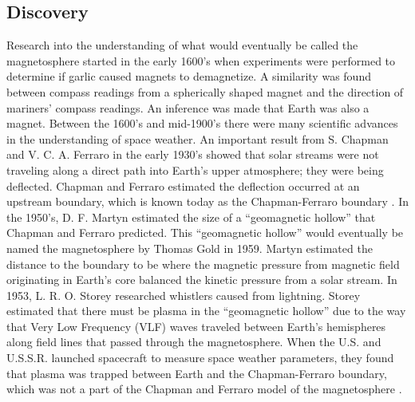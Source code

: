 \subsection{Discovery}
Research into the understanding of what would eventually be called the
magnetosphere started in the early 1600's when experiments were performed to
determine if garlic caused magnets to demagnetize. A similarity was found
between compass readings from a spherically shaped magnet and the direction of
mariners' compass readings. An inference was made that Earth was also a
magnet. Between the 1600's and mid-1900's there were many scientific advances in
the understanding of space weather. An important result from S.
Chapman and V. C. A. Ferraro in the early 1930's showed that solar streams were
not traveling along a direct path into Earth's upper atmosphere; they were being
deflected. Chapman and Ferraro estimated the deflection occurred at an upstream
boundary, which is known today as the Chapman-Ferraro boundary
\citep{Chapman1930}. In the 1950's, D. F. Martyn estimated the size of a
``geomagnetic hollow'' that Chapman and Ferraro predicted. This ``geomagnetic
hollow'' would eventually be named the magnetosphere by Thomas Gold in 1959.
Martyn estimated the distance to the boundary to be where the magnetic pressure
from magnetic field originating in Earth's core balanced the kinetic pressure
from a solar stream. In 1953, L. R. O. Storey researched whistlers caused from
lightning. Storey estimated that there must be plasma in the ``geomagnetic
hollow'' due to the way that Very Low Frequency (VLF) waves traveled between
Earth's hemispheres along field lines that passed through the magnetosphere.
When the U.S. and U.S.S.R. launched spacecraft to measure space weather parameters, they
found that plasma was trapped between Earth and the Chapman-Ferraro boundary,
which was not a part of the Chapman and Ferraro model of the magnetosphere
\citep{Kennel}.

